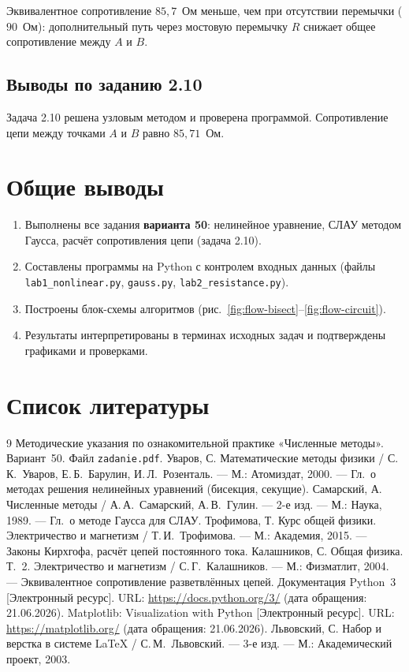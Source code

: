 \documentclass[12pt,a4paper]{scrartcl}
\begin{document}
Эквивалентное сопротивление $85{,}7$~Ом меньше, чем при отсутствии перемычки ($90$~Ом): дополнительный путь через мостовую перемычку $R$ снижает общее сопротивление между $A$ и $B$.

\subsection{Выводы по заданию 2.10}

Задача 2.10 решена узловым методом и проверена программой. Сопротивление цепи между точками $A$ и $B$ равно $85{,}71$~Ом.


\section{Общие выводы}

\begin{enumerate}
 \item Выполнены все задания \textbf{варианта 50}: нелинейное уравнение, СЛАУ методом Гаусса, расчёт сопротивления цепи (задача 2.10).
 \item Составлены программы на Python с контролем входных данных (файлы \texttt{lab1\_nonlinear.py}, \texttt{gauss.py}, \texttt{lab2\_resistance.py}).
 \item Построены блок-схемы алгоритмов (рис.~\ref{fig:flow-bisect}--\ref{fig:flow-circuit}).
 \item Результаты интерпретированы в терминах исходных задач и подтверждены графиками и проверками.
\end{enumerate}


\section{Список литературы}

\begin{thebibliography}{9}
Методические указания по ознакомительной практике «Численные методы». Вариант~50. Файл \texttt{zadanie.pdf}.
Уваров, С. Математические методы физики / С.\,К.~Уваров, Е.\,Б.~Барулин, И.\,Л.~Розенталь. --- М.: Атомиздат, 2000. --- Гл.~о методах решения нелинейных уравнений (бисекция, секущие).
Самарский, А. Численные методы / А.\,А.~Самарский, А.\,В.~Гулин. --- 2-е изд. --- М.: Наука, 1989. --- Гл.~о методе Гаусса для СЛАУ.
Трофимова, Т. Курс общей физики. Электричество и магнетизм / Т.\,И.~Трофимова. --- М.: Академия, 2015. --- Законы Кирхгофа, расчёт цепей постоянного тока.
Калашников, С. Общая физика. Т.~2. Электричество и магнетизм / С.\,Г.~Калашников. --- М.: Физматлит, 2004. --- Эквивалентное сопротивление разветвлённых цепей.
Документация Python~3 [Электронный ресурс]. URL: \url{https://docs.python.org/3/} (дата обращения: 21.06.2026).
Matplotlib: Visualization with Python [Электронный ресурс]. URL: \url{https://matplotlib.org/} (дата обращения: 21.06.2026).
Львовский, С. Набор и верстка в системе \LaTeX{} / С.\,М.~Львовский. --- 3-е изд. --- М.: Академический проект, 2003.
\end{thebibliography}
\end{document}
